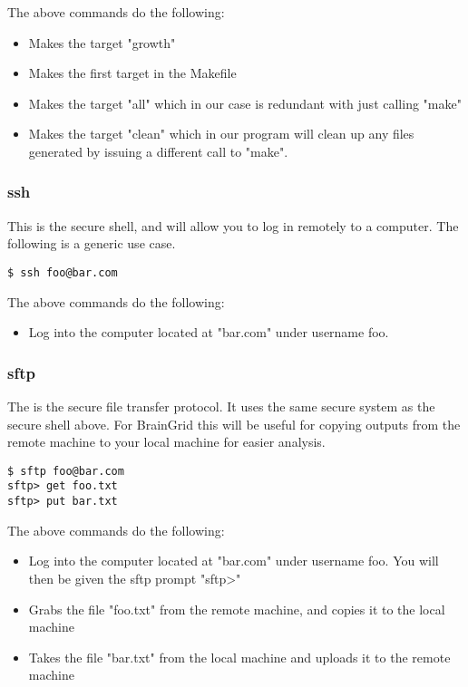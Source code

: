 The above commands do the following:
	\begin{itemize}
		\item Makes the target "growth"
		\item Makes the first target in the Makefile
		\item Makes the target "all" which in our case is redundant with just calling "make"
		\item Makes the target "clean" which in our program will clean up any files generated by issuing a different call to "make".
	\end{itemize}




\subsubsection{ssh} \mdseries
This is the secure shell, and will allow you to log in remotely to a computer.  The following is a generic use case.

\begin{lstlisting}
$ ssh foo@bar.com
\end{lstlisting}

The above commands do the following:
	\begin{itemize}
		\item Log into the computer located at "bar.com" under username foo.
	\end{itemize}
	
	
\subsubsection{sftp} \mdseries
The is the secure file transfer protocol.  It uses the same secure system as the secure shell above.  For BrainGrid this will be useful for copying outputs from the remote machine to your local machine for easier analysis.

\begin{lstlisting}
$ sftp foo@bar.com
sftp> get foo.txt
sftp> put bar.txt
\end{lstlisting}

The above commands do the following:
	\begin{itemize}
		\item Log into the computer located at "bar.com" under username foo.  You will then be given the sftp prompt "sftp>"
		\item Grabs the file "foo.txt" from the remote machine, and copies it to the local machine
		\item Takes the file "bar.txt" from the local machine and uploads it to the remote machine
	\end{itemize}

